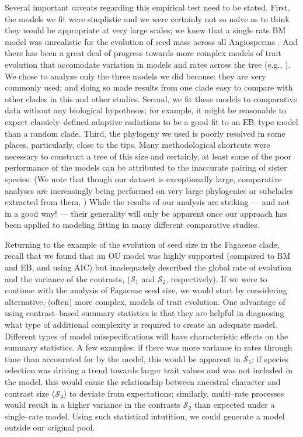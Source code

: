 \documentclass[a4paper,12pt]{article}
\begin{document}
Several important caveats regarding this empirical test need to be stated. First, the models we fit were simplistic and we were certainly not so na\"{i}ve as to think they would be appropriate at very large scales; we knew that a single rate BM model was unrealistic for the evolution of seed mass across all Angiosperms \citep{Moles2005}. And there has been a great deal of progress towards more complex models of trait evolution that accomodate variation in models and rates across the tree (e.g., \citep{ButlerKing2004, Omeara2006, Eastman2011, Beaulieu2012, SlaterMEE, UyedaBayou}). We chose to analyze only the three models we did because: they are very commonly used; and doing so made results from one clade easy to compare with other clades in this and other studies. Second, we fit these models to comparative data without any biological hypotheses; for example, it might be reasonable to expect classicly--defined adaptive radiations to be a good fit to an EB--type model \citep{Mahler2010, SlaterPennell} than a random clade. Third, the phylogeny we used is poorly resolved in some places, particularly, close to the tips. Many methodological shortcuts were necessary to construct a tree of this size and certainly, at least some of the poor performance of the models can be attributed to the inaccurate pairing of sister species. (We note that though our dataset is exceptionally large, comparative analyses are increasingly being performed on very large phylogenies or subclades extracted from them, \citep{Coopermammal, Jetz2012, PyronBurbrink2013, ksi}) While the results of our analysis are striking --- and not in a good way! --- their generality will only be apparent once our approach has been applied to modeling fitting in many different comparative studies.

Returning to the example of the evolution of seed size in the Fagaceae clade, recall that we found that an OU model was highly supported (compared to BM and EB, and using AIC) but inadequately described the global rate of evolution and the variance of the contrasts, ($\mathcal{S}_1$ and $\mathcal{S}_2$, respectively). If we were to continue with the analysis of Fagaceae seed size, we would start by considering alternative, (often) more complex, models of trait evolution. One advantage of using contrast--based summary statistics is that they are helpful in diagnosing what type of additional complexity is required to create an adequate model. Different types of model misspecifications will have characteristic effects on the summary statistics. A few examples: if there was more variance in rates through time than accournted for by the model, this would be apparent in $\mathcal{S}_5$; if species selection was driving a trend towards larger trait values and was not included in the model, this would cause the relationship between ancestral character and contrast size ($\mathcal{S}_4$) to deviate from expectations; similarly, multi--rate processes would result in a higher variance in the contrasts $\mathcal{S}_2$ than expected under a single--rate model. Using such statistical intutition, we could generate a model outside our original pool.
\end{document}
